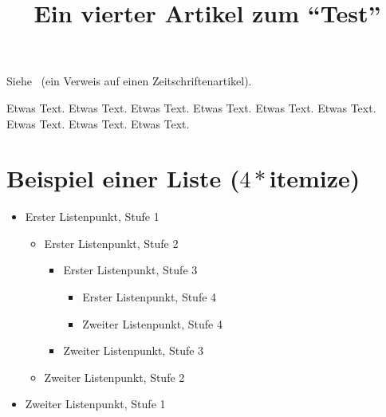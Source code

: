 \documentclass{dtk2}
\begin{document}
\title{Ein vierter Artikel zum "`Test"'}

\maketitle

Siehe~\cite{Niepraschk-dtk15.1:niepraschk.voss:texlivelist} (ein Verweis auf
einen Zeitschriftenartikel).

Etwas Text. Etwas Text. Etwas Text. Etwas Text. Etwas Text. Etwas Text.
Etwas Text. Etwas Text. Etwas Text.

\section{Beispiel einer Liste ($4*$itemize)}

\begin{itemize}
  \item Erster Listenpunkt, Stufe 1
  \begin{itemize}
    \item Erster Listenpunkt, Stufe 2
    \begin{itemize}
      \item Erster Listenpunkt, Stufe 3
      \begin{itemize}
        \item Erster Listenpunkt, Stufe 4
        \item Zweiter Listenpunkt, Stufe 4
      \end{itemize}
      \item Zweiter Listenpunkt, Stufe 3
    \end{itemize}
    \item Zweiter Listenpunkt, Stufe 2
  \end{itemize}
  \item Zweiter Listenpunkt, Stufe 1
\end{itemize}

\printbibliography
\end{document}
